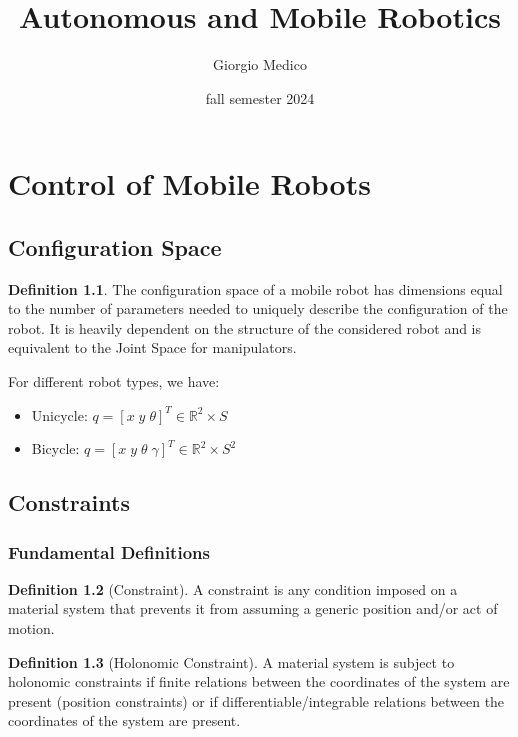 \documentclass[openany]{book}
\title{Autonomous and Mobile Robotics}
\author{Giorgio Medico}
\date{fall semester 2024}
\newcommand{\R}{\mathbb{R}}
\theoremstyle{definition}
\newtheorem{definition}{Definition}[section]
\theoremstyle{remark}
\begin{document}
\maketitle
\tableofcontents

\chapter{Control of Mobile Robots}

\section{Configuration Space}
\begin{definition}
The configuration space of a mobile robot has dimensions equal to the number of parameters needed to uniquely describe the configuration of the robot. It is heavily dependent on the structure of the considered robot and is equivalent to the Joint Space for manipulators.
\end{definition}

For different robot types, we have:
\begin{itemize}
    \item Unicycle: $q = [x \; y \; \theta]^T \in \R^2 \times S$
    \item Bicycle: $q = [x \; y \; \theta \; \gamma]^T \in \R^2 \times S^2$
\end{itemize}

\section{Constraints}

\subsection{Fundamental Definitions}

\begin{definition}[Constraint]
A constraint is any condition imposed on a material system that prevents it from assuming a generic position and/or act of motion.
\end{definition}

\begin{definition}[Holonomic Constraint]
A material system is subject to holonomic constraints if finite relations between the coordinates of the system are present (position constraints) or if differentiable/integrable relations between the coordinates of the system are present.
\end{definition}
\end{document}
